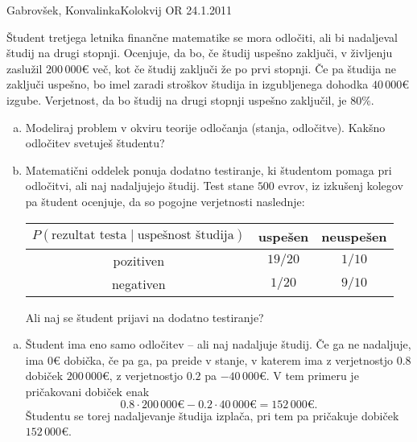 \begin{naloga}{Gabrovšek, Konvalinka}{Kolokvij OR 24.1.2011}
\begin{vprasanje}
Študent tretjega letnika finančne matematike se mora odločiti,
ali bi nadaljeval študij na drugi stopnji.
Ocenjuje, da bo, če študij uspešno zaključi,
v življenju zaslužil $200\,000 €$ več,
kot če študij zaključi že po prvi stopnji.
Če pa študija ne zaključi uspešno,
bo imel zaradi stroškov študija in izgubljenega dohodka $40\,000 €$ izgube.
Verjetnost, da bo študij na drugi stopnji uspešno zaključil, je $80 \%$.
\begin{enumerate}[(a)]
\item Modeliraj problem v okviru teorije odločanja (stanja, odločitve).
Kakšno odločitev svetuješ študentu?

\item Matematični oddelek ponuja dodatno testiranje,
ki študentom pomaga pri odločitvi, ali naj nadaljujejo študij.
Test stane $500$ evrov,
iz izkušenj kolegov pa študent ocenjuje,
da so pogojne verjetnosti naslednje:
\begin{center}
\begin{tabular}{c|cc}
$P(\text{rezultat testa} \;|\; \text{uspešnost študija})$
& uspešen & neuspešen \\ \hline
pozitiven & $19/20$ & $1/10$ \\
negativen & $1/20$ & $9/10$
\end{tabular}
\end{center}
Ali naj se študent prijavi na dodatno testiranje?
\end{enumerate}
\end{vprasanje}

\begin{odgovor}
\begin{enumerate}[(a)]
\item Študent ima eno samo odločitev -- ali naj nadaljuje študij.
Če ga ne nadaljuje, ima $0 €$ dobička,
če pa ga, pa preide v stanje,
v katerem ima z verjetnostjo $0.8$ dobiček $200\,000 €$,
z verjetnostjo $0.2$ pa $-40\,000 €$.
V tem primeru je pričakovani dobiček enak
$$
0.8 \cdot 200\,000 € - 0.2 \cdot 40\,000 € = 152\,000 € .
$$
Študentu se torej nadaljevanje študija izplača,
pri tem pa pričakuje dobiček $152\,000 €$.


\end{enumerate}
\end{odgovor}
\end{naloga}
